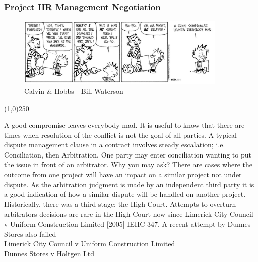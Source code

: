 \begin{frame}
\frametitle{Project HR Management \hfill Negotiation}
\begin{figure}[htbp]
	\centering
		\includegraphics[width=10cm]{images/candh.JPG}
	\caption{Calvin \& Hobbs - Bill Waterson}
	\label{fig:candh}
\end{figure}
\end{frame}\begin{center}\line(1,0){250}\end{center} 


A good compromise leaves everybody mad.  It is useful to know that there are times when resolution of the conflict is not the goal of all parties.  A typical dispute management clause in a contract involves steady escalation; i.e. Conciliation, then Arbitration.  One party may enter conciliation wanting to put the issue in front of an arbitrator.  Why you may ask?  There are cases where the outcome from one project will have an impact on a similar project not under dispute.  As the arbitration judgment is made by an independent third party it is a good indication of how a similar dispute will be handled on another project.  Historically, there was a third stage; the High Court.  Attempts to overturn arbitrators decisions are rare in the High Court now since Limerick City Council v Uniform Construction Limited [2005] IEHC 347. A recent attempt by Dunnes Stores also failed\\
\href{http://www.courts.ie/judgments.nsf/6681dee4565ecf2c80256e7e0052005b/8eda0a6f7c2422988025714d0056fb44?OpenDocument}{Limerick City Council v Uniform Construction Limited}\\
\href{http://courts.ie/Judgments.nsf/09859e7a3f34669680256ef3004a27de/9316804eb3eee080802579ce00517325?OpenDocument}{Dunnes Stores v Holtgen Ltd}\\


